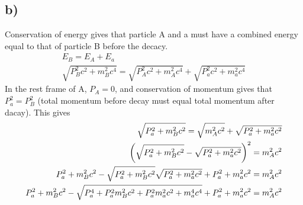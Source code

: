 \documentclass[12p,a4paper]{article}
\begin{document}
\subsection*{b)}
Conservation of energy gives that particle A and a must have a combined energy equal to that of particle B before the decacy.
\begin{align*}
    E_B = E_A + E_a\\
    \sqrt{P_B^2c^2 + m_B^2c^4} = \sqrt{P_A^2c^2 + m_A^2c^4} + \sqrt{P_a^2c^2 + m_a^2c^4}
\end{align*}
In the rest frame of A, $P_A = 0$, and conservation of momentum gives that $P_a^2 = P_B^2$ (total momentum before decay must equal total momentum after dacay). This gives
\begin{align*}
    \sqrt{P_a^2 + m_B^2c^2} = \sqrt{m_A^2c^2} + \sqrt{P_a^2 + m_a^2c^2} \\
    \qty(\sqrt{P_a^2 + m_B^2c^2} - \sqrt{P_a^2 + m_a^2c^2})^2 = m_A^2c^2 \\
    P_a^2 + m_B^2c^2 - \sqrt{P_a^2 + m_B^2c^2}\sqrt{P_a^2 + m_a^2c^2} + P_a^2 + m_a^2c^2 = m_A^2c^2 \\
    P_a^2 + m_B^2c^2 - \sqrt{P_a^4 + P_a^2m_B^2c^2 + P_a^2m_a^2c^2 + m_a^4c^4} + P_a^2 + m_a^2c^2 = m_A^2c^2 \\
\end{align*}

    
\end{document}
